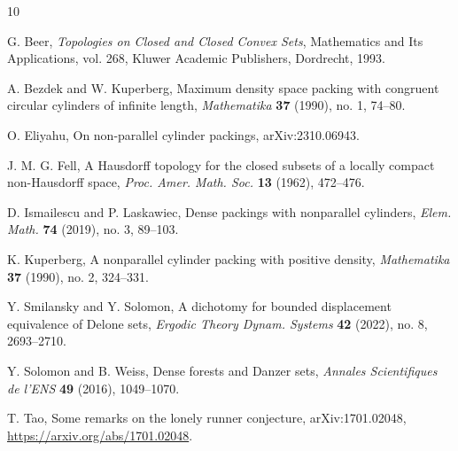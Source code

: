 \documentclass[11pt]{article}
\theoremstyle{remark}
\begin{document}
\begin{thebibliography}{10}

G. Beer,
\newblock \emph{Topologies on Closed and Closed Convex Sets},
\newblock Mathematics and Its Applications, vol. 268, Kluwer Academic Publishers, Dordrecht, 1993.


A. Bezdek and W. Kuperberg,
\newblock Maximum density space packing with congruent circular cylinders of infinite length,
\newblock \emph{Mathematika} \textbf{37} (1990), no. 1, 74--80.

O. Eliyahu,
\newblock On non-parallel cylinder packings,
\newblock arXiv:2310.06943.


J. M. G. Fell,
\newblock A Hausdorff topology for the closed subsets of a locally compact non-Hausdorff space,
\newblock \emph{Proc. Amer. Math. Soc.} \textbf{13} (1962), 472--476.

D. Ismailescu and P. Laskawiec,
\newblock Dense packings with nonparallel cylinders,
\newblock \emph{Elem. Math.} \textbf{74} (2019), no. 3, 89--103.

K. Kuperberg,
\newblock A nonparallel cylinder packing with positive density,
\newblock \emph{Mathematika} \textbf{37} (1990), no. 2, 324--331.

Y. Smilansky and Y. Solomon,
\newblock A dichotomy for bounded displacement equivalence of Delone sets,
\newblock \emph{Ergodic Theory Dynam. Systems} \textbf{42} (2022), no. 8, 2693--2710.

Y. Solomon and B. Weiss,
\newblock Dense forests and Danzer sets,
\newblock \emph{Annales Scientifiques de l'ENS} \textbf{49} (2016), 1049--1070.

T. Tao,
\newblock Some remarks on the lonely runner conjecture,
\newblock arXiv:1701.02048, \url{https://arxiv.org/abs/1701.02048}.

\end{thebibliography}
\end{document}
